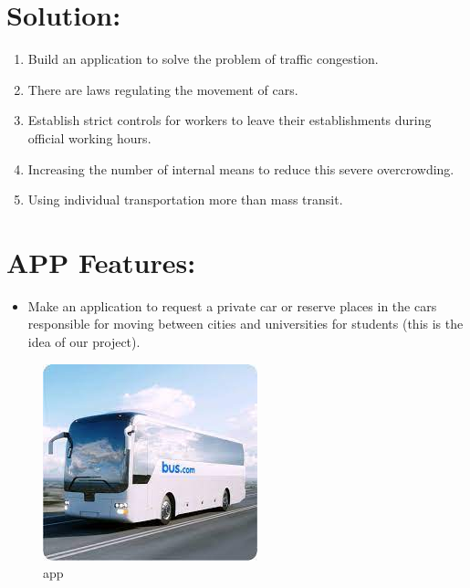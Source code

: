 \documentclass{article}
\begin{document}
\newpage

\section{Solution:}
\begin{enumerate}
  \item  Build an application to solve the problem of traffic congestion. 
  \item There are laws regulating the movement of cars. 
  \item Establish strict controls for workers to leave their establishments during 
official working hours. 
  \item Increasing 
the number of internal means to reduce this severe overcrowding.
  \item Using individual transportation more than mass transit. 
\end{enumerate}
\section{APP Features:}
\begin{itemize}
  \item Make an application to request a private car or reserve places in the cars 
responsible for moving between cities and universities for students (this is the 
idea of our project). 
\end{itemize}

\begin{figure}[!h]
   \centering
   \includegraphics{bus.jpg}
   \caption{app}
   \label{fig : app features}
\end{figure}
\end{document}
